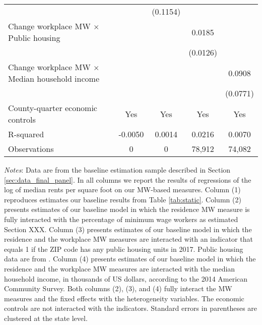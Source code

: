 \begin{table}[hbt!]
\begin{tabular}{@{}lcccc@{}}
                                                                &        & (0.1154) &        &        \\
        Change workplace MW $\times$ Public housing             &        &       &  0.0185   &        \\
                                                                &        &       & (0.0126)  &        \\
        Change workplace MW $\times$ Median household income    &        &       &        &  0.0908   \\
                                                                &        &       &        & (0.0771)  \\
        County-quarter economic controls                        &  Yes   &  Yes  &   Yes  &  Yes   \\
        R-squared                                               &  -0.0050   &  0.0014  &   0.0216  &  0.0070   \\
        Observations                                            &  0  &  0 &   78,912 &  74,082  \\ \bottomrule
    \end{tabular}

    \begin{minipage}{.95\textwidth} \footnotesize
        \vspace{2mm}
        \textit{Notes}: 
        Data are from the baseline estimation sample described in Section 
        \ref{sec:data_final_panel}.
        In all columns we report the results of regressions of the log of median rents 
        per square foot on our MW-based measures.
        Column (1) reproduces estimates our baseline results from Table \ref{tab:static}.
        Column (2) presents estimates of our baseline model in which the residence MW 
        measure is fully interacted with the percentage of minimum wage workers as estimated 
        Section XXX. 
        Column (3) presents estimates of our baseline model in which the residence and 
        the workplace MW measures are interacted with an indicator that equals 1 if 
        the ZIP code has any public housing units in 2017. Public housing data are from \textcite{hudHousing}.
        Column (4) presents estimates of our baseline model in which the residence and 
        the workplace MW measures are interacted with the median household income, in thousands of 
        US dollars, according to the 2014 American Community Survey.
        Both columns (2), (3), and (4) fully interact the MW measures and the fixed effects
        with the heterogeneity variables. The economic controls are not interacted with 
        the indicators.
        Standard errors in parentheses are clustered at the state level.
    \end{minipage}
\end{table}
